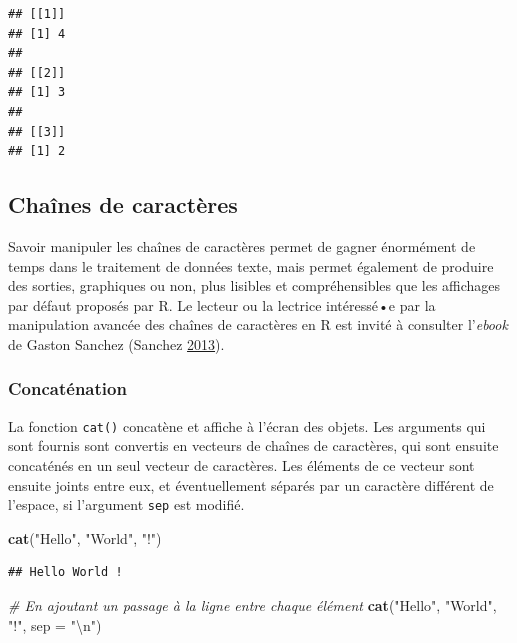 \documentclass[
  11pt,
]{book}
\newenvironment{Shaded}{\begin{snugshade}}{\end{snugshade}}
\newcommand{\CharTok}[1]{\textcolor[rgb]{0.31,0.60,0.02}{#1}}
\newcommand{\CommentTok}[1]{\textcolor[rgb]{0.56,0.35,0.01}{\textit{#1}}}
\newcommand{\DataTypeTok}[1]{\textcolor[rgb]{0.13,0.29,0.53}{#1}}
\newcommand{\KeywordTok}[1]{\textcolor[rgb]{0.13,0.29,0.53}{\textbf{#1}}}
\newcommand{\NormalTok}[1]{#1}
\newcommand{\StringTok}[1]{\textcolor[rgb]{0.31,0.60,0.02}{#1}}
\numberwithin{equation}{section}
\numberwithin{countremarque}{section}
\begin{document}
\begin{lstlisting}
## [[1]]
## [1] 4
## 
## [[2]]
## [1] 3
## 
## [[3]]
## [1] 2
\end{lstlisting}

\hypertarget{chauxeenes-de-caractuxe8res}{%
\subsection{Chaînes de caractères}\label{chauxeenes-de-caractuxe8res}}

Savoir manipuler les chaînes de caractères permet de gagner énormément de temps dans le traitement de données texte, mais permet également de produire des sorties, graphiques ou non, plus lisibles et compréhensibles que les affichages par défaut proposés par R. Le lecteur ou la lectrice intéressé•e par la manipulation avancée des chaînes de caractères en R est invité à consulter l'\emph{ebook} de Gaston Sanchez (Sanchez \protect\hyperlink{ref-Sanchez_2013_Handling}{2013}).

\hypertarget{concatuxe9nation}{%
\subsubsection{Concaténation}\label{concatuxe9nation}}

La fonction \texttt{cat()} concatène et affiche à l'écran des objets. Les arguments qui sont fournis sont convertis en vecteurs de chaînes de caractères, qui sont ensuite concaténés en un seul vecteur de caractères. Les éléments de ce vecteur sont ensuite joints entre eux, et éventuellement séparés par un caractère différent de l'espace, si l'argument \texttt{sep} est modifié.

\begin{Shaded}
\begin{Highlighting}[]
\KeywordTok{cat}\NormalTok{(}\StringTok{"Hello"}\NormalTok{, }\StringTok{"World"}\NormalTok{, }\StringTok{"!"}\NormalTok{)}
\end{Highlighting}
\end{Shaded}

\begin{lstlisting}
## Hello World !
\end{lstlisting}

\begin{Shaded}
\begin{Highlighting}[]
\CommentTok{\# En ajoutant un passage à la ligne entre chaque élément}
\KeywordTok{cat}\NormalTok{(}\StringTok{"Hello"}\NormalTok{, }\StringTok{"World"}\NormalTok{, }\StringTok{"!"}\NormalTok{, }\DataTypeTok{sep =} \StringTok{"}\CharTok{\textbackslash{}n}\StringTok{"}\NormalTok{)}
\end{Highlighting}
\end{Shaded}
\end{document}
